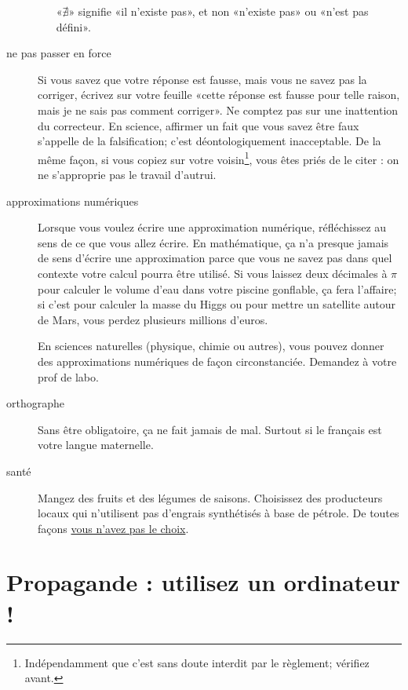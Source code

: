 \begin{description}
\begin{enumerate}
                «\( \nexists\)» signifie «il n'existe pas», et non «n'existe pas» ou «n'est pas défini».
        \end{enumerate}

    \item[ne pas passer en force] Si vous savez que votre réponse est fausse, mais vous ne savez pas la corriger, écrivez sur votre feuille «cette réponse est fausse pour telle raison, mais je ne sais pas comment corriger». Ne comptez pas sur une inattention du correcteur. En science, affirmer un fait que vous savez être faux s'appelle de la falsification; c'est déontologiquement inacceptable. De la même façon, si vous copiez sur votre voisin\footnote{Indépendamment que c'est sans doute interdit par le règlement; vérifiez avant.}, vous êtes priés de le citer : on ne s'approprie pas le travail d'autrui.

    \item[approximations numériques] Lorsque vous voulez écrire une approximation numérique, réfléchissez au sens de ce que vous allez écrire. En mathématique, ça n'a presque jamais de sens d'écrire une approximation parce que vous ne savez pas dans quel contexte votre calcul pourra être utilisé. Si vous laissez deux décimales à \( \pi\) pour calculer le volume d'eau dans votre piscine gonflable, ça fera l'affaire; si c'est pour calculer la masse du Higgs ou pour mettre un satellite autour de Mars, vous perdez plusieurs millions d'euros.

        En sciences naturelles (physique, chimie ou autres), vous pouvez donner des approximations numériques de façon circonstanciée. Demandez à votre prof de labo.

    \item[orthographe] Sans être obligatoire, ça ne fait jamais de mal. Surtout si le français est votre langue maternelle.
    \item[santé] Mangez des fruits et des légumes de saisons. Choisissez des producteurs locaux qui n'utilisent pas d'engrais synthétisés à base de pétrole. De toutes façons \href{http://www.energybulletin.net/node/51306}{vous n'avez pas le choix}.

\end{description}

\section{Propagande : utilisez un ordinateur !}

